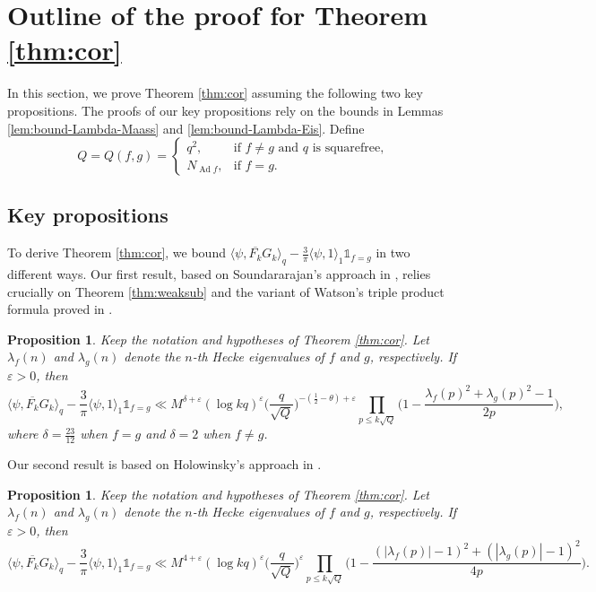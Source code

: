 \documentclass[12pt,reqno]{amsart}
\newtheorem{prop}[thm]{Proposition}
\theoremstyle{remark}
\DeclareMathOperator{\ad}{Ad}
\numberwithin{equation}{section}
\begin{document}
    
    \section{Outline of the proof for Theorem \ref{thm:cor}}
    \label{sec:outline-thm1.1-1.2}

    In this section, we prove Theorem \ref{thm:cor}  assuming the following two key propositions.  The proofs of our key propositions rely on the bounds in Lemmas \ref{lem:bound-Lambda-Maass} and \ref{lem:bound-Lambda-Eis}.
   Define
    \begin{equation}
    \label{eq:def-Q}
      Q = Q(f,g) = \begin{cases}
          q^2, &\mbox{if $f\neq g$ and $q$ is squarefree,}\\
          N_{\ad f}, &\mbox{if $f=g$.} 
      \end{cases}
   \end{equation}
    \subsection{Key propositions}
    To derive Theorem \ref{thm:cor}, we bound $\langle \psi, \overline{F_k}{G_k} \rangle_q -  \tfrac{3}{\pi}\langle \psi , 1 \rangle_1 \mathds{1}_{f=g}$ in two different ways. Our first result, based on Soundararajan's approach in \cite{S}, relies crucially on Theorem \ref{thm:weaksub} and the variant of Watson's triple product formula proved in \cite{N, NPS}.
	\begin{prop}\label{prop:Sound_cor} 
		Keep the notation and hypotheses of Theorem  \ref{thm:cor}. Let $\lambda_f(n)$ and $\lambda_g(n)$ denote the $n$-th Hecke eigenvalues of $f$ and $g$, respectively. If $\varepsilon>0$, then 
		\[
		\langle \psi, \overline{F_k}G_k \rangle_q -  \frac{3}{\pi}\langle \psi , 1 \rangle_1\mathds{1}_{f=g} \ll M^{\delta +\varepsilon}(\log kq)^{\varepsilon}\Big(\frac{q}{\sqrt{Q}}\Big)^{-(\frac{1}{2}-\theta)+\varepsilon}\prod_{p \le k\sqrt{Q}}\Big(1-\frac{\lambda_f(p)^2+\lambda_g(p)^2-1}{2p}\Big),
		\]
        where $\delta = \frac{23}{12}$ when $f = g$ and $\delta = 2$ when  $f \neq g$. 
	\end{prop} 


 
	Our second result is based on Holowinsky's approach in \cite{H}.
	
	\begin{prop}\label{prop:Holow_cor} 
		Keep the notation and hypotheses of Theorem  \ref{thm:cor}. Let $\lambda_f(n)$ and $\lambda_g(n)$ denote the $n$-th Hecke eigenvalues of $f$ and $g$, respectively. 
		If $\varepsilon>0$, then
		\[
		\langle \psi, \overline{F_k}G_k \rangle_q -  \frac{3}{\pi}\langle \psi , 1 \rangle_1\mathds{1}_{f=g} \ll M^{4+\varepsilon}(\log kq)^{\varepsilon}\Big(\frac{q}{\sqrt{Q}}\Big)^{\varepsilon}\prod_{p \le k\sqrt{Q}} \Big(1-\frac{(|\lambda_f(p)|-1)^2+(|\lambda_g(p)|-1)^2}{4p}\Big).
		\]
	\end{prop}
\end{document}
